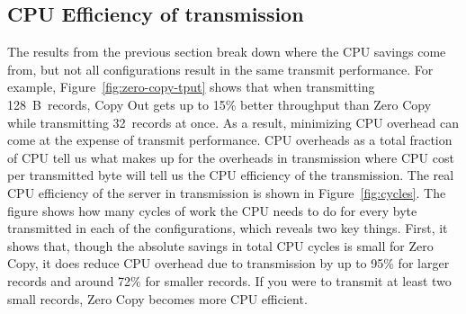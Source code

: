 

\subsection {CPU Efficiency of transmission}
The results from the previous section break down where the CPU savings come from,
but not all configurations result in the same transmit performance. For
example, Figure~\ref{fig:zero-copy-tput} shows that when transmitting
128~B~records, Copy Out gets up to 15\% better throughput than Zero Copy while transmitting
32~records at once. As a result, minimizing CPU overhead can come at the expense of transmit
performance. CPU overheads as a total fraction of CPU tell us what makes up for the overheads 
in transmission where CPU cost per transmitted byte will tell us the CPU efficiency of the 
transmission. The real CPU efficiency of the server in transmission is shown in
Figure~\ref{fig:cycles}. The figure shows how many cycles of work the CPU needs to do
for every byte transmitted in each of the configurations, which reveals two key things.
First, it shows that, though the absolute savings in total CPU cycles is small
for Zero Copy, it does reduce CPU overhead due to transmission by up to 95\% for 
larger records and around 72\% for smaller records. If you were to transmit at least 
two small records, Zero Copy becomes more CPU efficient.
\newline


%

%

